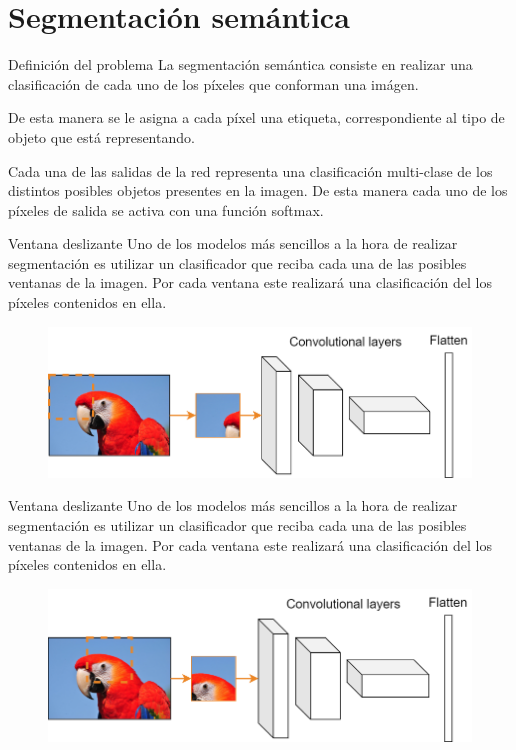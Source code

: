 \section{Segmentación semántica}

\begin{frame}{Definición del problema}
La \alert{segmentación semántica} consiste en realizar una \alert{clasificación} de cada uno de los \alert{píxeles} que conforman una imágen.

De esta manera se le asigna a cada píxel una \alert{etiqueta}, correspondiente al tipo de objeto que está \alert{representando}.

Cada una de las \alert{salidas de la red} representa una \alert{clasificación multi-clase} de los distintos posibles objetos presentes en la imagen. De esta manera cada uno de los \alert{píxeles de salida} se activa con una función \alert{softmax}.
\end{frame}

\begin{frame}{Ventana deslizante}
Uno de los modelos más \alert{sencillos} a la hora de realizar segmentación es utilizar un \alert{clasificador} que reciba cada una de las posibles ventanas de la imagen. Por cada ventana este realizará una \alert{clasificación} del los píxeles contenidos en ella.

\begin{figure}
    \centering
    \includegraphics[width=\textwidth]{figures/Tema 4/SlidingWindow.png}
\end{figure}
\end{frame}

\begin{frame}{Ventana deslizante}
Uno de los modelos más \alert{sencillos} a la hora de realizar segmentación es utilizar un \alert{clasificador} que reciba cada una de las posibles ventanas de la imagen. Por cada ventana este realizará una \alert{clasificación} del los píxeles contenidos en ella.

\begin{figure}
    \centering
    \includegraphics[width=\textwidth]{figures/Tema 4/SlidingWindow_1.png}
\end{figure}
\end{frame}

